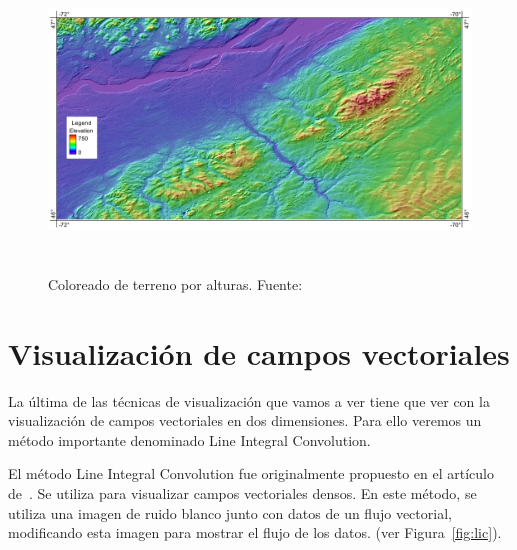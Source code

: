 \begin{figure}[!ht]
	\centering	
	\includegraphics[height=8cm]{figures/terraincoloring.jpg}
	\caption[Coloreado de terreno por alturas.]{Coloreado de terreno por
	alturas. Fuente:~\cite{terraincoloringimage}}
	\label{fig:terrain}
\end{figure}

\section{Visualización de campos vectoriales}
\label{ref:lic}

La última de las técnicas de visualización que vamos a ver tiene que ver con la
visualización de campos vectoriales en dos dimensiones. Para ello veremos un
método importante denominado Line Integral Convolution.

El método Line Integral Convolution fue originalmente propuesto en el artículo
de~\citet{osti_10185520}. Se utiliza para visualizar campos vectoriales densos.
En este método, se utiliza una imagen de ruido blanco junto con datos de un
flujo vectorial, modificando esta imagen para mostrar el flujo de los datos.
(ver Figura~\ref{fig:lic}). 


